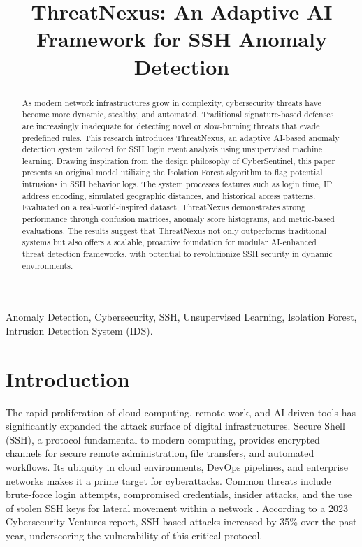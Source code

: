 \documentclass[conference]{IEEEtran}
\begin{document}
\title{ThreatNexus: An Adaptive AI Framework for SSH Anomaly Detection}

\author{
}

\maketitle

\begin{abstract}
As modern network infrastructures grow in complexity, cybersecurity threats have become more dynamic, stealthy, and automated. Traditional signature-based defenses are increasingly inadequate for detecting novel or slow-burning threats that evade predefined rules. This research introduces ThreatNexus, an adaptive AI-based anomaly detection system tailored for SSH login event analysis using unsupervised machine learning. Drawing inspiration from the design philosophy of CyberSentinel, this paper presents an original model utilizing the Isolation Forest algorithm to flag potential intrusions in SSH behavior logs. The system processes features such as login time, IP address encoding, simulated geographic distances, and historical access patterns. Evaluated on a real-world-inspired dataset, ThreatNexus demonstrates strong performance through confusion matrices, anomaly score histograms, and metric-based evaluations. The results suggest that ThreatNexus not only outperforms traditional systems but also offers a scalable, proactive foundation for modular AI-enhanced threat detection frameworks, with potential to revolutionize SSH security in dynamic environments.
\end{abstract}

\begin{IEEEkeywords}
Anomaly Detection, Cybersecurity, SSH, Unsupervised Learning, Isolation Forest, Intrusion Detection System (IDS).
\end{IEEEkeywords}

\section{Introduction}
The rapid proliferation of cloud computing, remote work, and AI-driven tools has significantly expanded the attack surface of digital infrastructures. Secure Shell (SSH), a protocol fundamental to modern computing, provides encrypted channels for secure remote administration, file transfers, and automated workflows. Its ubiquity in cloud environments, DevOps pipelines, and enterprise networks makes it a prime target for cyberattacks. Common threats include brute-force login attempts, compromised credentials, insider attacks, and the use of stolen SSH keys for lateral movement within a network \cite{ahmed2016survey}. According to a 2023 Cybersecurity Ventures report, SSH-based attacks increased by 35\% over the past year, underscoring the vulnerability of this critical protocol.
\end{document}
